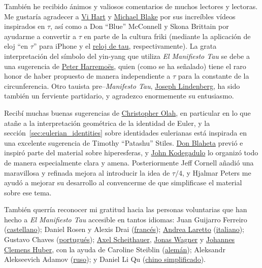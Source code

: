 También he recibido ánimos y valiosos comentarios de muchos lectores y lectoras. Me gustaría agradecer a \href{http://www.youtube.com/watch?v=jG7vhMMXagQ}{Vi Hart} y \href{http://www.youtube.com/watch?v=3174T-3-59Q}{Michael Blake} por sus increíbles vídeos inspirados en $\tau$, así como a Don ``Blue'' McConnell y Skona Brittain por ayudarme a convertir a $\tau$ en parte de la cultura friki (mediante la aplicación de eloj ``en $\tau$'' para iPhone y el \href{http://www.sbcrafts.net/clocks/}{reloj de tau}, respectivamente). La grata interpretación del símbolo del yin-yang que utiliza \emph{El Manifiesto Tau} se debe a una sugerencia de \href{http://www.harremoes.dk/Peter/}{Peter Harremo\"{e}s}, quien (como se ha señalado) tiene el raro honor de haber propuesto de manera independiente a $\tau$ para la constante de la circunferencia. Otro tauista pre--\emph{Manifesto Tau}, \href{https://sites.google.com/site/taubeforeitwascool/}{Joseph Lindenberg}, ha sido también un ferviente partidario, y agradezco enormemente su entusiasmo. 

Recibí muchas buenas sugerencias de \href{http://christopherolah.wordpress.com/about-me}{Christopher Olah}, en particular en lo que atañe a la interpretación geométrica de la identidad de Euler, y la sección~\ref{sec:eulerian_identities} sobre identidades eulerianas está inspirada en una excelente sugerencia de Timothy ``Patashu'' Stiles. \href{http://www.blahedo.org/blog/archives/001083.html}{Don Blaheta} previó e inspiró parte del material sobre hiperesferas, y \href{http://spikedmath.com/forum/viewtopic.php?f=30&t=147\#p1577}{John Kodegadulo} lo organizó todo de manera especialmente clara y amena. Posteriormente Jeff Cornell añadió una maravillosa y refinada mejora al introducir la idea de $\tau/4$, y Hjalmar Peters me ayudó a mejorar su desarrollo al convencerme de que simplificase el material sobre ese tema. 

También querría reconocer mi gratitud hacia las personas voluntarias que han hecho a \emph{El Manifiesto Tau} accesible en tantos idiomas: Juan Guijarro Ferreiro (\href{https://tauday.com/el-manifiesto-tau}{castellano}); Daniel Rosen y Alexis Drai (\href{https://tauday.com/le-manifeste-de-tau}{francés}); \href{https://iwilare.com/}{Andrea Laretto} (\href{https://tauday.com/il-tau-manifesto}{italiano}); Gustavo Chaves (\href{https://tauday.com/o-manifesto-tau}{portugués}); \href{https://www.linkedin.com/in/axelscheithauer/}{Axel Scheithauer}, \href{https://blog.purpureus.net/about}{Jonas Wagner} y \href{https://www.blogger.com/profile/05561964491693491031}{Johannes Clemens Huber}, con la ayuda de Caroline Steiblin (\href{https://tauday.com/das-tau-manifest}{alemán}); Aleksandr Alekseevich Adamov (\href{https://tauday.com/tau-manifesto-ru}{ruso}); y Daniel Li Qu (\href{https://tauday.com/tau-manifesto-cn}{chino simplificado}).

